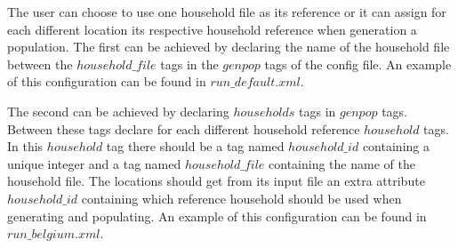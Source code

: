 The user can choose to use one household file as its reference or it can assign for each different location its respective household reference when generation a population.
The first can be achieved by declaring the name of the household file between the $household\_file$ tags in the $genpop$ tags of the config file.
An example of this configuration can be found in $run\_default.xml$.


The second can be achieved by declaring $households$ tags in $genpop$ tags. Between these tags declare for each different household reference $household$ tags.
In this $household$ tag there should be a tag named $household\_id$ containing a unique integer and a tag named $household\_file$ containing the name of the household file.
The locations should get from its input file an extra attribute $household\_id$ containing which reference household should be used when generating and populating.
An example of this configuration can be found in $run\_belgium.xml$.
